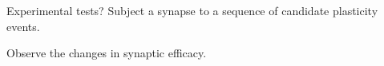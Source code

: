\documentclass[final,hyperref={pdfpagelabels=false,bookmarks=false}]{beamer}
\begin{document}
\begin{frame}{}
\begin{columns}[t]
\begin{column}{0.33\linewidth}



\begin{block}{Experimental tests?}
%
 Subject a synapse to a sequence of candidate plasticity events.

 Observe the changes in synaptic efficacy.

 \begin{center}
   \begin{inlineenumerate}
     \item {} \hspace{0.02\linewidth}
     \item {} \hspace{0.02\linewidth}
     \item {} \hspace{0.02\linewidth}
     \item {} \hspace{0.02\linewidth}

\end{inlineenumerate}
\end{center}
\end{block}
\end{column}
\end{columns}
\end{frame}
\end{document}
